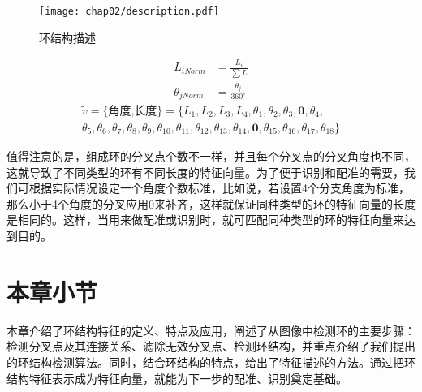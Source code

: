\begin{figure}[H]
\centering
\texttt{[image: chap02/description.pdf]}
\caption{环结构描述}
\label{fig:description}
\end{figure}
\begin{align}
L_{iNorm}&=\frac{L_i}{\sum{L}}\label{eq:length}\\
\theta_{jNorm}&=\frac{\theta_j}{360^\circ}\label{eq:angle}
\end{align}
\begin{multline}
\tilde{v}=\{\textrm{角度,长度}\}=\{L_{1},L_{2},L_{3},L_{4},\theta_{1},\theta_{2},\theta_{3},\mathbf{0},\theta_{4},\\\theta_{5},\theta_{6},\theta_{7},\theta_{8},\theta_{9},\theta_{10},\theta_{11},\theta_{12},\theta_{13},\theta_{14},\mathbf{0},\theta_{15},\theta_{16},\theta_{17},\theta_{18}\}
\label{eq:vector}
\end{multline}

值得注意的是，组成环的分叉点个数不一样，并且每个分叉点的分叉角度也不同，这就导致了不同类型的环有不同长度的特征向量。为了便于识别和配准的需要，我们可根据实际情况设定一个角度个数标准，比如说，若设置4个分支角度为标准，那么小于4个角度的分叉应用0来补齐，这样就保证同种类型的环的特征向量的长度是相同的。这样，当用来做配准或识别时，就可匹配同种类型的环的特征向量来达到目的。

\section{本章小节}
\label{}

本章介绍了环结构特征的定义、特点及应用，阐述了从图像中检测环的主要步骤：检测分叉点及其连接关系、滤除无效分叉点、检测环结构，并重点介绍了我们提出的环结构检测算法。同时，结合环结构的特点，给出了特征描述的方法。通过把环结构特征表示成为特征向量，就能为下一步的配准、识别奠定基础。

